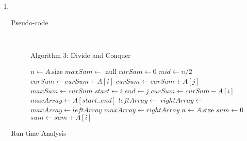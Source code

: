 \documentclass[paper=a4, fontsize=11pt]{scrartcl} %
\numberwithin{equation}{section} %
\numberwithin{figure}{section} %
\numberwithin{table}{section} %
\begin{document}
\begin{enumerate}[label=\bfseries Algorithm \arabic*:]
    \item \hfill \\
    \begin{description}
        \item[Pseudo-code] \hfill \\
        \begin{algorithmc}
            \caption{Algorithm 3: Divide and Conquer}
                \State $n \gets A$.size
                \State $maxSum \gets$ null
                \State $curSum \gets 0$
                \State $mid \gets n / 2$
                    $curSum \gets curSum + A[i]$
                \EndFor
                        \State $curSum \gets curSum + A[j]$
                            \State $maxSum \gets curSum$
                            \State $start \gets i$
                            \State $end \gets j$
                        \EndIf
                    \EndFor
                    \State $curSum \gets curSum - A[i]$
                \EndFor
                \State $maxArray \gets A[start..end]$
                \State $leftArray \gets$ 
                \State $rightArray \gets$ 
                    \State $maxArray \gets leftArray$
                \EndIf
                    \State $maxArray \gets rightArray$
                \EndIf
                \State {}
            \EndFunction
                \State $n \gets A$.size
                \State $sum \gets 0$
                    \State $sum \gets sum + A[i]$
                \EndFor
                \State {}
            \EndFunction
        \end{algorithmc}
        \item[Run-time Analysis] \hfill \\
    \end{description}


\end{enumerate}
\end{document}
